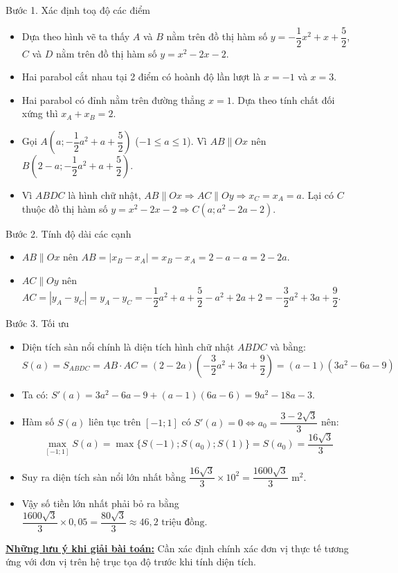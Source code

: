 \documentclass[12pt,a4paper,oneside]{book}
\theoremstyle{theorem}
\theoremstyle{definition}
\begin{document}
         Bước 1. Xác định toạ độ các điểm
\begin{itemize}
    \item Dựa theo hình vẽ ta thấy $A$ và $B$ nằm trên đồ thị hàm số $y = -\dfrac{1}{2}x^2 + x + \dfrac{5}{2}$, $C$ và $D$ nằm trên đồ thị hàm số $y = x^2 - 2x - 2$.
    \item Hai parabol cắt nhau tại 2 điểm có hoành độ lần lượt là $x = -1$ và $x = 3$.
    \item Hai parabol có đỉnh nằm trên đường thẳng $x = 1$. Dựa theo tính chất đối xứng thì $x_A + x_B = 2$.
    \item Gọi $A\left(a; -\dfrac{1}{2}a^2 + a + \dfrac{5}{2}\right)$ ($-1 \le a \le 1$). Vì $AB \parallel Ox$ nên $B\left(2 - a; -\dfrac{1}{2}a^2 + a + \dfrac{5}{2}\right)$.
    \item Vì $ABDC$ là hình chữ nhật, $AB \parallel Ox \Rightarrow AC \parallel Oy \Rightarrow x_C = x_A = a$. Lại có $C$ thuộc đồ thị hàm số $y = x^2 - 2x - 2 \Rightarrow C(a; a^2 - 2a - 2)$.
\end{itemize}

Bước 2. Tính độ dài các cạnh
\begin{itemize}
    \item $AB \parallel Ox$ nên $AB = |x_B - x_A| = x_B - x_A = 2 - a - a = 2 - 2a$.
    \item $AC \parallel Oy$ nên $AC = |y_A - y_C| = y_A - y_C = -\dfrac{1}{2}a^2 + a + \dfrac{5}{2} - a^2 + 2a + 2 = -\dfrac{3}{2}a^2 + 3a + \dfrac{9}{2}$.
\end{itemize}

Bước 3. Tối ưu
\begin{itemize}
    \item Diện tích sàn nổi chính là diện tích hình chữ nhật $ABDC$ và bằng:
    $$S(a) = S_{ABDC} = AB \cdot AC = (2 - 2a)\left(-\dfrac{3}{2}a^2 + 3a + \frac{9}{2}\right) = (a - 1)(3a^2 - 6a - 9)$$
    \item Ta có: $S'(a) = 3a^2 - 6a - 9 + (a - 1)(6a - 6) = 9a^2 - 18a - 3$.
    \item Hàm số $S(a)$ liên tục trên $[-1; 1]$ có $S'(a) = 0 \iff a_0 = \dfrac{3 - 2\sqrt{3}}{3}$ nên:
    $$\max_{[-1; 1]} S(a) = \max\{S(-1); S(a_0); S(1)\} = S(a_0) = \dfrac{16\sqrt{3}}{3}$$
    \item Suy ra diện tích sàn nổi lớn nhất bằng $\dfrac{16\sqrt{3}}{3} \times 10^2 = \dfrac{1600\sqrt{3}}{3}\text{ m}^2$.
    \item Vậy số tiền lớn nhất phải bỏ ra bằng $\dfrac{1600\sqrt{3}}{3} \times 0,05 = \dfrac{80\sqrt{3}}{3} \approx 46,2\text{ triệu đồng}$.
\end{itemize}
        \textbf{\underline{Những lưu ý khi giải bài toán:}}
        Cần xác định chính xác đơn vị thực tế tương ứng với đơn vị trên hệ trục tọa độ trước khi tính diện tích.
\end{document}

